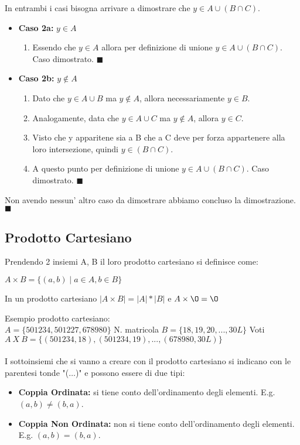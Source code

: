 In entrambi i casi bisogna arrivare a dimostrare che $y \in A \cup (B \cap C)$.
\begin{itemize}
    \item \textbf{Caso 2a:} $y \in A$
    \begin{enumerate}
        \item Essendo che $y \in A$ allora per definizione di unione $y \in A \cup (B \cap C)$. Caso dimostrato. $\blacksquare$
    \end{enumerate}
    \item \textbf{Caso 2b:} $y \notin A$
    \begin{enumerate}
        \item Dato che $y \in A \cup B$ ma $y \notin A$, allora necessariamente $y \in B$.
        \item Analogamente, data che $y \in A \cup C$ ma $y \notin A$, allora $y \in C$.
        \item Visto che y apparitene sia a B che a C deve per forza appartenere alla loro intersezione, quindi $y \in (B \cap C)$.
        \item A questo punto per definizione di unione $y \in A \cup (B \cap C)$. Caso dimostrato. $\blacksquare$
    \end{enumerate}
\end{itemize}
Non avendo nessun' altro caso da dimostrare abbiamo concluso la dimostrazione. $\blacksquare$

\subsection{Prodotto Cartesiano}
Prendendo 2 insiemi A, B il loro prodotto cartesiano si definisce come:
\begin{center}
    $A \times B = \{(a, b) \mid a \in A, b \in B\}$
\end{center}
\begin{note}
	In un prodotto cartesiano $\lvert A \times B \rvert = \lvert A \rvert * \lvert B \rvert$ e $A \times \O = \O$
\end{note}
\begin{example}
    Esempio prodotto cartesiano:\\
    $A = \{501234, 501227, 678980\}$ N. matricola \hspace{1cm}
    $B = \{18, 19, 20, ..., 30L\}$ Voti \\
    $A \: X \: B = \{(501234, 18), (501234, 19), ..., (678980, 30L)\}$\\ \\
    I sottoinsiemi che si vanno a creare con il prodotto cartesiano si indicano con le parentesi tonde "($\ldots$)" e possono essere di due tipi:
    \begin{itemize}
        \item \textbf{Coppia Ordinata:} si tiene conto dell'ordinamento degli elementi. E.g. $(a, b) \neq (b, a)$.
        \item \textbf{Coppia Non Ordinata:} non si tiene conto dell'ordinamento degli elementi. E.g. $(a, b) = (b, a)$.
	\end{itemize}
\end{example}

